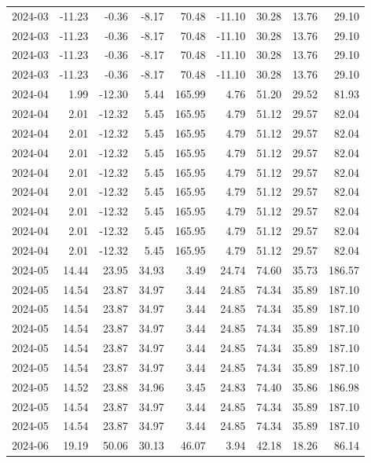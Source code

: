 \begin{table}[ht]
\begin{tabular}{lrrrrrrrr}
  2024-03 & -11.23 & -0.36 & -8.17 & 70.48 & -11.10 & 30.28 & 13.76 & 29.10 \\ 
  2024-03 & -11.23 & -0.36 & -8.17 & 70.48 & -11.10 & 30.28 & 13.76 & 29.10 \\ 
  2024-03 & -11.23 & -0.36 & -8.17 & 70.48 & -11.10 & 30.28 & 13.76 & 29.10 \\ 
  2024-03 & -11.23 & -0.36 & -8.17 & 70.48 & -11.10 & 30.28 & 13.76 & 29.10 \\ 
  2024-04 & 1.99 & -12.30 & 5.44 & 165.99 & 4.76 & 51.20 & 29.52 & 81.93 \\ 
  2024-04 & 2.01 & -12.32 & 5.45 & 165.95 & 4.79 & 51.12 & 29.57 & 82.04 \\ 
  2024-04 & 2.01 & -12.32 & 5.45 & 165.95 & 4.79 & 51.12 & 29.57 & 82.04 \\ 
  2024-04 & 2.01 & -12.32 & 5.45 & 165.95 & 4.79 & 51.12 & 29.57 & 82.04 \\ 
  2024-04 & 2.01 & -12.32 & 5.45 & 165.95 & 4.79 & 51.12 & 29.57 & 82.04 \\ 
  2024-04 & 2.01 & -12.32 & 5.45 & 165.95 & 4.79 & 51.12 & 29.57 & 82.04 \\ 
  2024-04 & 2.01 & -12.32 & 5.45 & 165.95 & 4.79 & 51.12 & 29.57 & 82.04 \\ 
  2024-04 & 2.01 & -12.32 & 5.45 & 165.95 & 4.79 & 51.12 & 29.57 & 82.04 \\ 
  2024-04 & 2.01 & -12.32 & 5.45 & 165.95 & 4.79 & 51.12 & 29.57 & 82.04 \\ 
  2024-05 & 14.44 & 23.95 & 34.93 & 3.49 & 24.74 & 74.60 & 35.73 & 186.57 \\ 
  2024-05 & 14.54 & 23.87 & 34.97 & 3.44 & 24.85 & 74.34 & 35.89 & 187.10 \\ 
  2024-05 & 14.54 & 23.87 & 34.97 & 3.44 & 24.85 & 74.34 & 35.89 & 187.10 \\ 
  2024-05 & 14.54 & 23.87 & 34.97 & 3.44 & 24.85 & 74.34 & 35.89 & 187.10 \\ 
  2024-05 & 14.54 & 23.87 & 34.97 & 3.44 & 24.85 & 74.34 & 35.89 & 187.10 \\ 
  2024-05 & 14.54 & 23.87 & 34.97 & 3.44 & 24.85 & 74.34 & 35.89 & 187.10 \\ 
  2024-05 & 14.52 & 23.88 & 34.96 & 3.45 & 24.83 & 74.40 & 35.86 & 186.98 \\ 
  2024-05 & 14.54 & 23.87 & 34.97 & 3.44 & 24.85 & 74.34 & 35.89 & 187.10 \\ 
  2024-05 & 14.54 & 23.87 & 34.97 & 3.44 & 24.85 & 74.34 & 35.89 & 187.10 \\ 
  2024-06 & 19.19 & 50.06 & 30.13 & 46.07 & 3.94 & 42.18 & 18.26 & 86.14 \\ 

\end{tabular}
\end{table}
